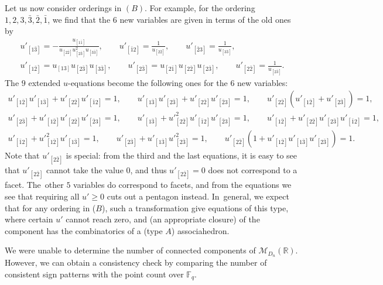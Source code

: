 \documentclass[pdftex]{sigma}%
\def\R{{\mathbb R}}
\def\F{{\mathbb F}}
\def\M{{\mathcal{M}}}
\numberwithin{equation}{section}
\begin{document}
Let us now consider orderings in $(B)$. For example, for the ordering $1, 2, 3, \bar{3}, \bar{2}, \bar{1}$, we find that the $6$ new variables are given in terms of the old ones by
\begin{gather*}
u'_{[1 \bar{3}]}=-\frac{u_{[1 \bar{1}]}}{u_{[2 \bar{2}]} u^2_{[2 \bar{3}]} u_{[3 \bar{3}]}},\qquad u'_{[\bar{1} 2]}=\frac{1}{u_{[2 \bar{2}]}},\qquad
u'_{[\bar{2} 3]}=\frac{1}{u_{[3 \bar{3}]}},
\\
u'_{[1 \bar{2}]}=u_{[13]} u_{[2 \bar{3}]} u_{[3 \bar{3}]},\qquad
u'_{[2 \bar{3}]}=u_{[2 \bar{1}]} u_{[2 \bar{2}]} u_{[2 \bar{3}]},\qquad
u'_{[2 \bar{2}]}=\frac{1}{u_{[2 \bar{3}]}}.
\end{gather*}
The $9$ extended $u$-equations become the following ones for the $6$ new variables:
\begin{gather*}
u'_{[1 \bar{2}]} u'_{[1 \bar{3}]}+u'_{[2 \bar{2}]} u'_{[\bar{1} 2]}=1,\qquad
u'_{[1 \bar{3}]} u'_{[2 \bar{3}]}+ u'_{[2 \bar{2}]} u'_{[\bar{2} 3]}=1,\qquad
u'_{[2 \bar{2}]} (u'_{[1 \bar{2}]}+ u'_{[2 \bar{3}]}) =1,
\\[.5ex]
u'_{[2 \bar{3}]}+ u'_{[1\bar{2}]} u'_{[2 \bar{2}]} u'_{[\bar{2} 3]}=1,\qquad
u'_{[1 \bar{3}]}+ u'^2_{[2 \bar{2}]} u'_{[\bar{1} 2]} u'_{[ \bar{2} 3]}=1,\qquad
u'_{[1 \bar{2}]}+u'_{[2 \bar{2}]} u'_{[2 \bar{3}]} u'_{[\bar{1} 2]}=1,
\\[.5ex]
u'_{[\bar{1} 2]}+u'^2_{[1 \bar{2}]} u'_{[1 \bar{3}]}=1, \qquad
u'_{[2 \bar{3}]}+ u'_{[1 \bar{3}]} u'^2_{[2 \bar{3}]}=1, \qquad
u'_{[2 \bar{2}]} (1+ u'_{[1 \bar{2}]} u'_{[1 \bar{3}]} u'_{[2 \bar{3}]})=1.
\end{gather*}
Note that $u'_{[2 \bar{2}]}$ is special: from the third and the last equations, it is easy to see that $u'_{[ 2 \bar{2}]}$ cannot take the value 0, and thus $u'_{[2 \bar{2}]}=0$ does not correspond to a facet. The~other $5$ variables do correspond to facets, and from the equations we see that requiring all $u' \geq 0$ cuts out a pentagon instead. In~general, we expect that for any ordering in ($B$), such a transformation give equations of this type, where certain $u'$ cannot reach zero, and (an appropriate closure) of the component has the combinatorics of a (type $A$) associahedron.

\bigskip{} %
We were unable to determine the number of connected components of $\M_{D_n}(\R)$. However, we can obtain a consistency check by comparing the number of consistent sign patterns with the point count over $\F_q$.
\end{document}
